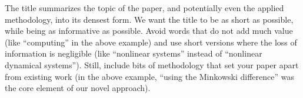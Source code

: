 


\noindent The title summarizes the topic of the paper, and potentially even the applied methodology, into its densest form.
We want the title to be as short as possible, while being as informative as possible.
Avoid words that do not add much value (like ``computing'' in the above example) and use short versions where the loss of information is negligible (like ``nonlinear systems'' instead of ``nonlinear dynamical systems'').
Still, include bits of methodology that set your paper apart from existing work (in the above example, ``using the Minkowski difference'' was the core element of our novel approach).
